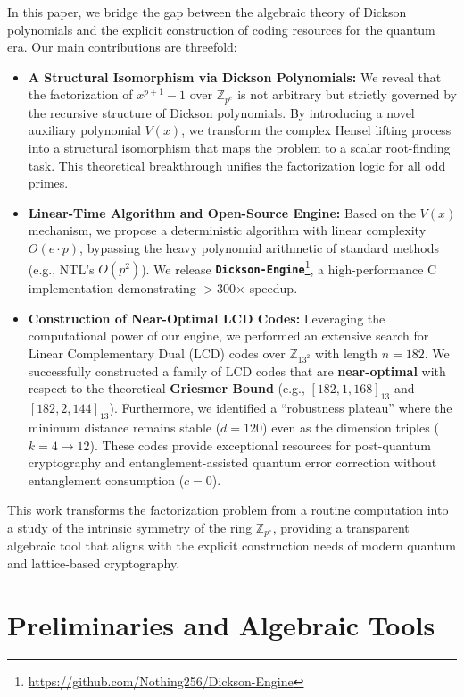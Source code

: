 \documentclass[12pt]{article}
\theoremstyle{plain}
\numberwithin{equation}{section}
\begin{document}
In this paper, we bridge the gap between the algebraic theory of Dickson polynomials and the explicit construction of coding resources for the quantum era. Our main contributions are threefold:

\begin{itemize}
    \item \textbf{A Structural Isomorphism via Dickson Polynomials:} 
    We reveal that the factorization of $x^{p+1}-1$ over $\mathbb{Z}_{p^e}$ is not arbitrary but strictly governed by the recursive structure of Dickson polynomials. By introducing a novel auxiliary polynomial $V(x)$, we transform the complex Hensel lifting process into a structural isomorphism that maps the problem to a scalar root-finding task. This theoretical breakthrough unifies the factorization logic for all odd primes.

    \item \textbf{Linear-Time Algorithm and Open-Source Engine:} 
    Based on the $V(x)$ mechanism, we propose a deterministic algorithm with linear complexity $O(e \cdot p)$, bypassing the heavy polynomial arithmetic of standard methods (e.g., NTL's $O(p^2)$). We release \textbf{\texttt{Dickson-Engine}}\footnote{\url{https://github.com/Nothing256/Dickson-Engine}}, a high-performance C implementation demonstrating $>$300$\times$ speedup.

    \item \textbf{Construction of Near-Optimal LCD Codes:} 
    Leveraging the computational power of our engine, we performed an extensive search for Linear Complementary Dual (LCD) codes over $\mathbb{Z}_{13^2}$ with length $n=182$. We successfully constructed a family of LCD codes that are \textbf{near-optimal} with respect to the theoretical \textbf{Griesmer Bound} (e.g., $[182, 1, 168]_{13}$ and $[182, 2, 144]_{13}$). Furthermore, we identified a ``robustness plateau'' where the minimum distance remains stable ($d=120$) even as the dimension triples ($k=4 \to 12$). These codes provide exceptional resources for post-quantum cryptography and entanglement-assisted quantum error correction without entanglement consumption ($c=0$).
\end{itemize}

This work transforms the factorization problem from a routine computation into a study of the intrinsic symmetry of the ring $\mathbb{Z}_{p^e}$, providing a transparent algebraic tool that aligns with the explicit construction needs of modern quantum and lattice-based cryptography.


\section{Preliminaries and Algebraic Tools}
\label{sec:preliminaries}
\end{document}
